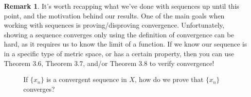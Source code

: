 \documentclass{article}
\newcommand{\R}{\mathbb{R}}
\theoremstyle{definition}
\newtheorem{remark}{Remark}[section]
\begin{document}
\begin{remark}
	It's worth recapping what we've done with sequences up until this point, and the motivation behind our results. One of the main goals when working with sequences is proving/disproving convergence. Unfortunately, showing a sequence converges only using the definition of convergence can be hard, as it requires us to know the limit of a function. If we know our sequence is in a specific type of metric space, or has a certain property, then you can use Theorem 3.6, Theorem 3.7, and/or Theorem 3.8 to verify convergence! 
	\begin{figure}[h!]
		\caption{If $ \{x_n\} $ is a convergent sequence in $ X $, how do we prove that $ \{x_n\} $ converges?}
	\end{figure}
\end{remark}
\end{document}
